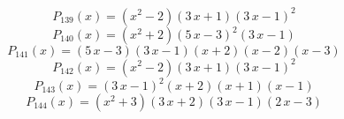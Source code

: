\subitem \begin{dmath*}P_{139}(x) = {\left(x^{2} - 2\right)} {\left(3 \, x + 1\right)} {\left(3 \, x - 1\right)}^{2} \end{dmath*}\vspace{- 1.20000000000000 cm}
\subitem \begin{dmath*}P_{140}(x) = {\left(x^{2} + 2\right)} {\left(5 \, x - 3\right)}^{2} {\left(3 \, x - 1\right)} \end{dmath*}\vspace{- 1.20000000000000 cm}
\subitem \begin{dmath*}P_{141}(x) = {\left(5 \, x - 3\right)} {\left(3 \, x - 1\right)} {\left(x + 2\right)} {\left(x - 2\right)} {\left(x - 3\right)} \end{dmath*}\vspace{- 1.20000000000000 cm}
\subitem \begin{dmath*}P_{142}(x) = {\left(x^{2} - 2\right)} {\left(3 \, x + 1\right)} {\left(3 \, x - 1\right)}^{2} \end{dmath*}\vspace{- 1.20000000000000 cm}
\subitem \begin{dmath*}P_{143}(x) = {\left(3 \, x - 1\right)}^{2} {\left(x + 2\right)} {\left(x + 1\right)} {\left(x - 1\right)} \end{dmath*}\vspace{- 1.20000000000000 cm}
\subitem \begin{dmath*}P_{144}(x) = {\left(x^{2} + 3\right)} {\left(3 \, x + 2\right)} {\left(3 \, x - 1\right)} {\left(2 \, x - 3\right)} \end{dmath*}\vspace{- 1.20000000000000 cm}


